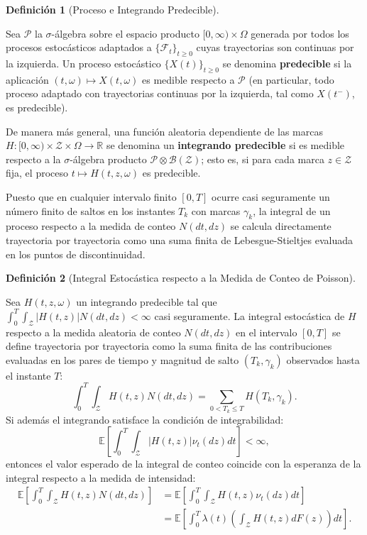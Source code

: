 \documentclass[
  spanish,
  us-letterpaper,
]{scrreprt}
\numberwithin{equation}{section}
\theoremstyle{plain}
\theoremstyle{plain}
\theoremstyle{definition}
\newtheorem{definition}{Definición}[chapter]
\theoremstyle{plain}
\theoremstyle{remark}
\begin{document}
\begin{definition}[Proceso e Integrando
Predecible]\protect\hypertarget{def-proceso-predecible}{}\label{def-proceso-predecible}

Sea \(\mathcal{P}\) la \(\sigma\)-álgebra sobre el espacio producto
\([0, \infty) \times \Omega\) generada por todos los procesos
estocásticos adaptados a \(\{\mathcal{F}_t\}_{t \ge 0}\) cuyas
trayectorias son continuas por la izquierda. Un proceso estocástico
\(\{X(t)\}_{t \ge 0}\) se denomina \textbf{predecible} si la aplicación
\((t, \omega) \mapsto X(t, \omega)\) es medible respecto a
\(\mathcal{P}\) (en particular, todo proceso adaptado con trayectorias
continuas por la izquierda, tal como \(X(t^-)\), es predecible).

De manera más general, una función aleatoria dependiente de las marcas
\(H: [0, \infty) \times \mathcal{Z} \times \Omega \to \mathbb{R}\) se
denomina un \textbf{integrando predecible} si es medible respecto a la
\(\sigma\)-álgebra producto
\(\mathcal{P} \otimes \mathcal{B}(\mathcal{Z})\); esto es, si para cada
marca \(z \in \mathcal{Z}\) fija, el proceso
\(t \mapsto H(t, z, \omega)\) es predecible.

\end{definition}

Puesto que en cualquier intervalo finito \([0, T]\) ocurre casi
seguramente un número finito de saltos en los instantes \(T_k\) con
marcas \(\gamma_k\), la integral de un proceso respecto a la medida de
conteo \(N(dt, dz)\) se calcula directamente trayectoria por trayectoria
como una suma finita de Lebesgue-Stieltjes evaluada en los puntos de
discontinuidad.

\begin{definition}[Integral Estocástica respecto a la Medida de Conteo
de
Poisson]\protect\hypertarget{def-integral-conteo}{}\label{def-integral-conteo}

Sea \(H(t, z, \omega)\) un integrando predecible tal que
\(\displaystyle \int_0^T \int_{\mathcal{Z}} \vert H(t, z) \vert N(dt, dz) < \infty\)
casi seguramente. La integral estocástica de \(H\) respecto a la medida
aleatoria de conteo \(N(dt, dz)\) en el intervalo \([0, T]\) se define
trayectoria por trayectoria como la suma finita de las contribuciones
evaluadas en los pares de tiempo y magnitud de salto \((T_k, \gamma_k)\)
observados hasta el instante \(T\): \[
\int_0^T \int_{\mathcal{Z}} H(t, z) N(dt, dz) = \sum_{0 < T_k \le T} H(T_k, \gamma_k).
\] Si además el integrando satisface la condición de integrabilidad: \[
\mathbb{E}\left[ \displaystyle \int_0^T \int_{\mathcal{Z}} \vert H(t, z) \vert \nu_t(dz) dt \right] < \infty,
\] entonces el valor esperado de la integral de conteo coincide con la
esperanza de la integral respecto a la medida de intensidad: \[
\begin{aligned}
\mathbb{E}\left[ \int_0^T \int_{\mathcal{Z}} H(t, z) N(dt, dz) \right] &= \mathbb{E}\left[ \int_0^T \int_{\mathcal{Z}} H(t, z) \nu_t(dz) dt \right] \\
&= \mathbb{E}\left[ \int_0^T \lambda(t) \left( \int_{\mathcal{Z}} H(t, z) dF(z) \right) dt \right].
\end{aligned}
\]

\end{definition}
\end{document}
